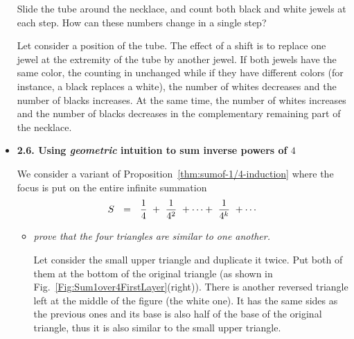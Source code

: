\begin{itemize}
\smallskip

Slide the tube around the necklace, and count both black and white jewels at each step.  
How can these numbers change in a single step?
\smallskip

Let consider a position of the tube. 
The effect of a shift is to replace one jewel at the extremity of the tube by another jewel. 
If both jewels have the same color, the counting in unchanged while if they have different colors
(for instance, a black replaces a white), the number of whites decreases and the number of blacks increases. 
At the same time, the number of whites increases and the number of blacks decreases in the complementary 
remaining part of the necklace. 

\medskip \item
{\bf 2.6. Using {\em geometric} intuition to sum inverse powers of $4$}
\smallskip

We consider a variant of Proposition~\ref{thm:sumof-1/4-induction} where the focus is put on the entire infinite summation
\[ S \ \ = \ \  {1 \over 4} \ + \  {1 \over 4^2} \ + \cdots + \ {1 \over 4^k} \ + \cdots  \]

\smallskip


\begin{itemize}
\item
{\em prove that the four triangles are similar to one another.}
\smallskip

Let consider the small upper triangle and duplicate it twice.
Put both of them at the bottom of the original triangle
(as shown in Fig.~\ref{Fig:Sum1over4FirstLayer}(right)). 
There is another reversed triangle left at the middle of the figure (the white one). 
It has the same sides as the previous ones and its base is also half of the base of the original triangle,
thus it is also similar to the small upper triangle.


\end{itemize}
\end{itemize}
